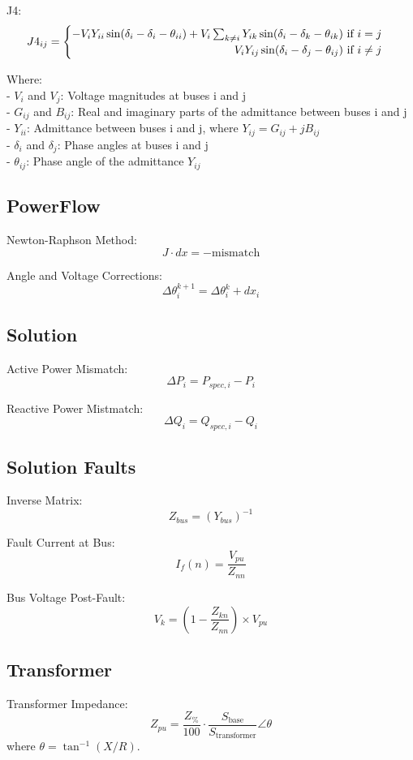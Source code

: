 \documentclass{article}
\begin{document}
	\noindent
	J4: 
	\[
		J4_{ij} = 
		\begin{cases}
			\hfill -V_i Y_{ii} \sin(\delta_i - \delta_i - \theta_{ii}) + V_i \sum_{k \neq i} Y_{ik} \sin(\delta_i - \delta_k - \theta_{ik}) \text{ if } i = j \\
			\hfill V_i Y_{ij} \sin(\delta_i - \delta_j - \theta_{ij}) \text{ if } i \neq j
		\end{cases}
	\]
	
	\noindent
	Where: \\
	- $V_i$ and $V_j$: Voltage magnitudes at buses i and j \\
	- $G_{ij}$ and $B_{ij}$: Real and imaginary parts of the admittance between buses i and j \\
	- $Y_{ii}$: Admittance between buses i and j, where $Y_{ij} = G_{ij} + j B_{ij}$ \\
	- $\delta_i$ and $\delta_j$: Phase angles at buses i and j \\
	- $\theta_{ij}$: Phase angle of the admittance $Y_{ij}$
	
	\subsection*{PowerFlow}
	Newton-Raphson Method: 
	\[
	J \cdot dx = -\text{mismatch}
	\]
	
	\noindent
	Angle and Voltage Corrections: 
	\[
	\Delta \theta_{i}^{k+1} = \Delta \theta_i^k + dx_i
	\]
	
	\subsection*{Solution}
	Active Power Mismatch: 
	\[
	\Delta P_i = P_{spec,i} - P_i
	\]

	\noindent	
	Reactive Power Mistmatch: 
	\[
	\Delta Q_i = Q_{spec,i} - Q_i
	\]
	
	\subsection*{Solution Faults}
	Inverse Matrix: 
	\[
	Z_{bus} = (Y_{bus})^{-1}
	\]
	
	\noindent
	Fault Current at Bus: 
	\[
	I_f(n) = \frac{V_{pu}}{Z_{nn}}
	\]
	
	\noindent
	Bus Voltage Post-Fault: 
	\[
	V_k = (1 - \frac{ Z_{kn} }{ Z_{nn} }) \times V_{pu}
	\]
	
	\subsection*{Transformer}
	\noindent
	Transformer Impedance:
	\[ Z_{pu} = \frac{Z_\%}{100} \cdot \frac{S_{\text{base}}}{S_{\text{transformer}}} \angle{\theta} \]
	where \( \theta = \tan^{-1}(X/R) \). \\
	
\end{document}
